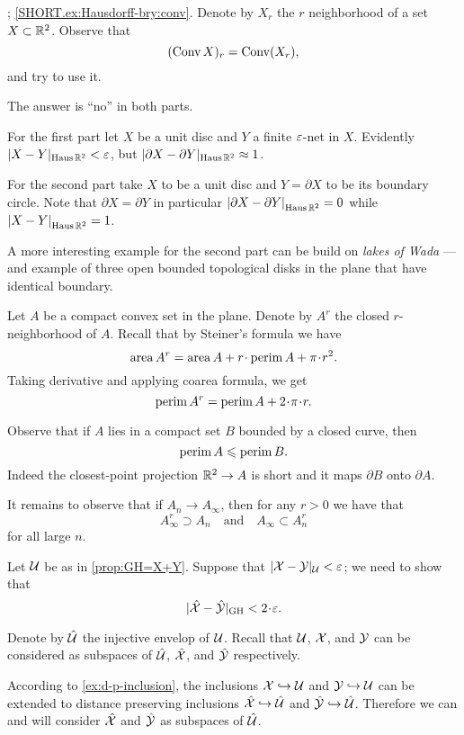 

\parbf{\ref{ex:Hausdorff-bry}}; \ref{SHORT.ex:Hausdorff-bry:conv}.
Denote by $X_r$ the $r$ neighborhood of a set $X\z\subset \RR^2$.
Observe  that 
\[(\mathop{\rm Conv}\nolimits X)_r=\mathop{\rm Conv}\nolimits(X_r),\]
and try to use it.

The answer is ``no'' in both parts.

For the first part let $X$ be a unit disc and $Y$ a finite $\varepsilon$-net in $X$.
Evidently $|X-Y|_{\operatorname{\rm Haus}\nolimits\mathbb{R}^2}<\varepsilon$, 
but
$|\partial X-\partial Y|_{\operatorname{\rm Haus}\nolimits\mathbb{R}^2}\approx 1$.

For the second part take $X$ to be a unit disc and $Y=\partial X$ to be its boundary circle.
Note that $\partial X=\partial Y$ in particular $\dist{\partial X}{\partial Y}{\Haus\RR^2}=0$ while $\dist{ X}{ Y}{\Haus\RR^2}=1$.

A more interesting example for the second part can be build on {}\emph{lakes of Wada} --- and example of three open bounded topological disks in the plane that have identical boundary.

Let $A$ be a compact convex set in the plane.
Denote by $A^r$ the closed $r$-neighborhood of $A$.
Recall that by Steiner's formula we have
\[\area A^r=\area A+r\cdot\perim A+\pi\cdot r^2.\]
Taking derivative and applying coarea formula, we get 
\[\perim A^r=\perim A+2\cdot\pi\cdot r.\]

Observe that if $A$ lies in a compact set $B$ bounded by a closed curve, then 
\[\operatorname{\rm perim}\nolimits A\leqslant \operatorname{\rm perim}\nolimits B.\]
Indeed the closest-point projection $\mathbb{R}^2\to A$ is short and it maps $\partial B$ onto $\partial A$.

It remains to observe that if $A_n\to A_\infty$, then for any $r>0$ we have that
\[A_\infty^r\supset A_n
\quad\text{and}\quad
A_\infty\subset A_n^r\]
for all large $n$.


Let $\mathcal{U}$ be as in \ref{prop:GH=X+Y}.
Suppose that $|\mathcal{X}-\mathcal{Y}|_{\mathcal{U}}<\varepsilon$;
we need to show that 
\[|\hat{\spc{X}}-\hat{\spc{Y}}|_{\GH}<2\cdot \eps.\]

Denote by $\hat{\mathcal{U}}$ the injective envelop of $\mathcal{U}$.
Recall that $\mathcal{U}$, $\mathcal{X}$, and $\mathcal{Y}$ can be considered as subspaces of $\hat{\mathcal{U}}$, $\hat{\mathcal{X}}$, and $\hat{\mathcal{Y}}$ respectively.

According to \ref{ex:d-p-inclusion}, the inclusions $\mathcal{X}\hookrightarrow\mathcal{U}$ and $\mathcal{Y}\hookrightarrow\mathcal{U}$ can be extended to distance preserving inclusions $\hat{\mathcal{X}}\hookrightarrow\hat{\mathcal{U}}$ and $\hat{\mathcal{Y}}\hookrightarrow\hat{\mathcal{U}}$.
Therefore we can and will consider  $\hat{\mathcal{X}}$ and $\hat{\mathcal{Y}}$ as subspaces of $\hat{\mathcal{U}}$.


